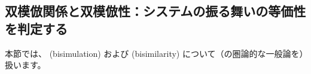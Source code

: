 \documentclass[
		head_space=20mm,
		foot_space=20mm,
		gutter=10mm,
		line_length=190mm
]{jlreq}
\begin{document}

\clearpage

\subsection{双模倣関係と双模倣性：システムの振る舞いの等価性を判定する}

\noindent 本節では、 (bisimulation) および (bisimilarity) について（の圏論的な一般論を）扱います。
\end{document}
